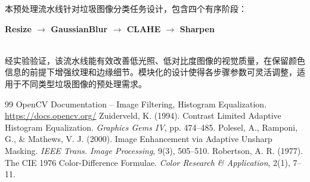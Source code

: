 \documentclass[12pt,a4paper]{ctexart}
\begin{document}
本预处理流水线针对垃圾图像分类任务设计，包含四个有序阶段：\\[4pt]
\centerline{\textbf{Resize $\rightarrow$ GaussianBlur $\rightarrow$ CLAHE $\rightarrow$ Sharpen}}\\[4pt]
经实验验证，该流水线能有效改善低光照、低对比度图像的视觉质量，在保留颜色信息的前提下增强纹理和边缘细节。模块化的设计使得各步骤参数可灵活调整，适用于不同类型垃圾图像的预处理需求。

\begin{thebibliography}{99}
 OpenCV Documentation -- Image Filtering, Histogram Equalization.
  \url{https://docs.opencv.org/}
 Zuiderveld, K. (1994). Contrast Limited Adaptive Histogram Equalization. \emph{Graphics Gems IV}, pp. 474--485.
 Polesel, A., Ramponi, G., \& Mathews, V. J. (2000). Image Enhancement via Adaptive Unsharp Masking. \emph{IEEE Trans. Image Processing}, 9(3), 505--510.
 Robertson, A. R. (1977). The CIE 1976 Color-Difference Formulae. \emph{Color Research \& Application}, 2(1), 7--11.
\end{thebibliography}
\end{document}
